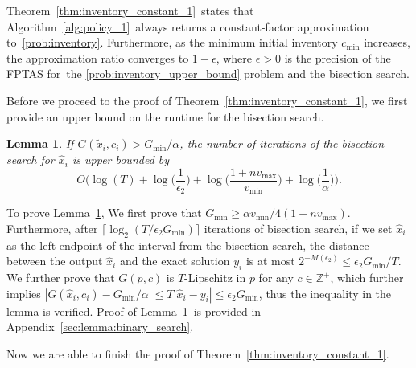 \documentclass[mnsc,non-blindrev]{informs3}
\newtheorem{lemma}[theorem]{Lemma}
\theoremstyle{definition}
\begin{document}
Theorem~\ref{thm:inventory_constant_1}~states that Algorithm~\ref{alg:policy_1}~always returns a constant-factor approximation to~\ref{prob:inventory}. Furthermore, as the minimum initial inventory $c_{\min}$ increases, the approximation ratio converges to $1-\epsilon$, where $\epsilon>0$ is the precision of the FPTAS for~the \ref{prob:inventory_upper_bound} problem and the bisection search.

Before we proceed to the proof of Theorem~\ref{thm:inventory_constant_1}, we first provide an upper bound on the runtime for the bisection search.

\vspace{0.5em}

\begin{lemma}\label{lemma:binary_search}
If $G(\tilde{x}_i,c_i)>G_{\min}/\alpha$, the number of iterations of the bisection search for $\hat{x}_i$ is upper bounded by
\begin{equation*}
O\Big(\log(T)+\log\Big(\dfrac{1}{\epsilon_2}\Big)+\log\Big(\dfrac{1+nv_{\max}}{v_{\min}}\Big)+\log\Big(\dfrac{1}{\alpha}\Big)\Big).
\end{equation*}
\end{lemma}

\vspace{0.5em}

To prove Lemma~\ref{lemma:binary_search}, We first prove that $G_{\min}\geq \alpha v_{\min}/4(1+nv_{\max})$. Furthermore, after $\lceil\log_2(T/\epsilon_2G_{\min})\rceil$ iterations of bisection search, if we set $\hat{x}_i$ as the left endpoint of the interval from the bisection search, the distance between the output $\hat{x}_i$ and the exact solution $y_i$ is at most \mbox{$2^{-M(\epsilon_2)}\leq \epsilon_2G_{\min}/T$.} We further prove that $G(p,c)$ is $T$-Lipschitz in $p$ for any $c\in\mathbb{Z}^+$, which further implies \mbox{$|G(\hat{x}_i,c_i)-G_{\min}/\alpha|\leq T|\hat{x}_i-y_i|\leq \epsilon_2G_{\min}$,} thus the inequality in the lemma is verified. Proof of Lemma~\ref{lemma:binary_search}~is provided in Appendix~\ref{sec:lemma:binary_search}.

Now we are able to finish the proof of Theorem~\ref{thm:inventory_constant_1}.
\end{document}
